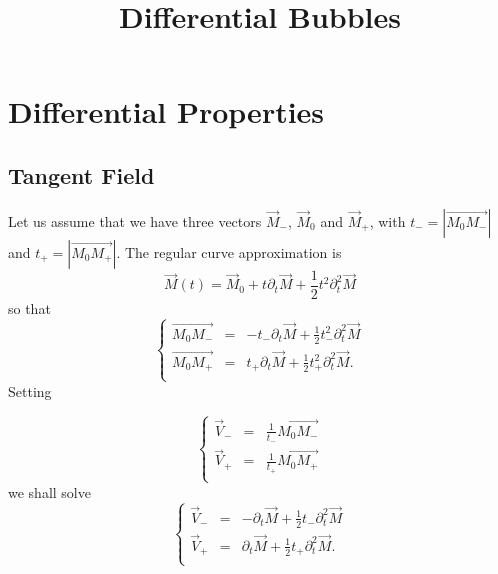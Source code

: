 \documentclass[aps]{revtex4}
\newcommand{\myvec}[1]{\overrightarrow{#1}}
\begin{document}
\title{Differential Bubbles}
\maketitle

\section{Differential Properties}

\subsection{Tangent Field}
Let us assume that we have three vectors $\vec{M}_-$, $\vec{M}_0$ and $\vec{M}_+$, with
$t_-=\left\vert \myvec{M_0M_-}\right\vert$ and $t_+=\left\vert \myvec{M_0M_+}\right\vert$.
The regular curve approximation is
\begin{equation}
	\vec{M}(t) = \vec{M}_0 + t \partial_t \vec{M} + \frac{1}{2} t^2 \partial_{t}^2 \vec{M}
\end{equation}
so that
\begin{equation}
\left\lbrace
\begin{array}{rcl}
	\myvec{M_0M_-} & = & -t_- \partial_t \vec{M} + \frac{1}{2} t_-^2 \partial_{t}^2 \vec{M}\\
	\myvec{M_0M_+} & = &  t_+ \partial_t \vec{M} + \frac{1}{2} t_+^2 \partial_{t}^2 \vec{M}.\\
\end{array}
\right.
\end{equation}
Setting

\begin{equation}
\left\lbrace
\begin{array}{rcl}
	\vec{V}_- & = & \frac{1}{t_-} \myvec{M_0M_-}\\
	\vec{V}_+ & = & \frac{1}{t_+} \myvec{M_0M_+}\\
\end{array}
\right.
\end{equation}
we shall solve
\begin{equation}
	\left\lbrace
	\begin{array}{rcl}
	\vec{V}_- & = & -\partial_t \vec{M} + \frac{1}{2} t_- \partial_{t}^2 \vec{M}\\
	\vec{V}_+ & = & \partial_t \vec{M} + \frac{1}{2} t_+ \partial_{t}^2 \vec{M}.\\
	\end{array}
\right.
\end{equation}
\end{document}
